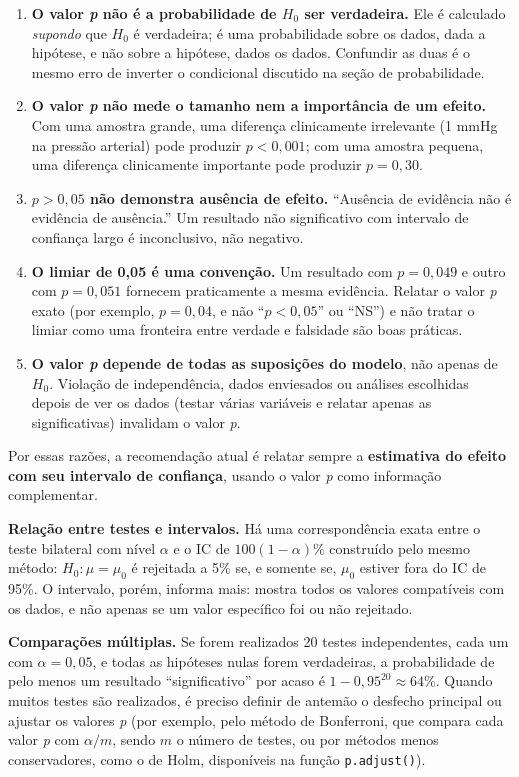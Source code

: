 \documentclass[
]{book}
\providecommand{\tightlist}{%
  \setlength{\itemsep}{0pt}\setlength{\parskip}{0pt}}
\begin{document}
\begin{enumerate}
\def\labelenumi{\arabic{enumi}.}
\tightlist
\item
  \textbf{O valor \emph{p} não é a probabilidade de \(H_0\) ser verdadeira.} Ele é calculado \emph{supondo} que \(H_0\) é verdadeira; é uma probabilidade sobre os dados, dada a hipótese, e não sobre a hipótese, dados os dados. Confundir as duas é o mesmo erro de inverter o condicional discutido na seção de probabilidade.
\item
  \textbf{O valor \emph{p} não mede o tamanho nem a importância de um efeito.} Com uma amostra grande, uma diferença clinicamente irrelevante (1 mmHg na pressão arterial) pode produzir \(p < 0{,}001\); com uma amostra pequena, uma diferença clinicamente importante pode produzir \(p = 0{,}30\).
\item
  \textbf{\(p > 0{,}05\) não demonstra ausência de efeito.} ``Ausência de evidência não é evidência de ausência.'' Um resultado não significativo com intervalo de confiança largo é inconclusivo, não negativo.
\item
  \textbf{O limiar de 0,05 é uma convenção.} Um resultado com \(p = 0{,}049\) e outro com \(p = 0{,}051\) fornecem praticamente a mesma evidência. Relatar o valor \emph{p} exato (por exemplo, \(p = 0{,}04\), e não ``\(p < 0{,}05\)'' ou ``NS'') e não tratar o limiar como uma fronteira entre verdade e falsidade são boas práticas.
\item
  \textbf{O valor \emph{p} depende de todas as suposições do modelo}, não apenas de \(H_0\). Violação de independência, dados enviesados ou análises escolhidas depois de ver os dados (testar várias variáveis e relatar apenas as significativas) invalidam o valor \emph{p}.
\end{enumerate}

Por essas razões, a recomendação atual é relatar sempre a \textbf{estimativa do efeito com seu intervalo de confiança}, usando o valor \emph{p} como informação complementar.

\textbf{Relação entre testes e intervalos.} Há uma correspondência exata entre o teste bilateral com nível \(\alpha\) e o IC de \(100(1-\alpha)\%\) construído pelo mesmo método: \(H_0\colon \mu = \mu_0\) é rejeitada a 5\% se, e somente se, \(\mu_0\) estiver fora do IC de 95\%. O intervalo, porém, informa mais: mostra todos os valores compatíveis com os dados, e não apenas se um valor específico foi ou não rejeitado.

\textbf{Comparações múltiplas.} Se forem realizados 20 testes independentes, cada um com \(\alpha = 0{,}05\), e todas as hipóteses nulas forem verdadeiras, a probabilidade de pelo menos um resultado ``significativo'' por acaso é \(1 - 0{,}95^{20} \approx 64\%\). Quando muitos testes são realizados, é preciso definir de antemão o desfecho principal ou ajustar os valores \emph{p} (por exemplo, pelo método de Bonferroni, que compara cada valor \emph{p} com \(\alpha/m\), sendo \(m\) o número de testes, ou por métodos menos conservadores, como o de Holm, disponíveis na função \texttt{p.adjust()}).
\end{document}
